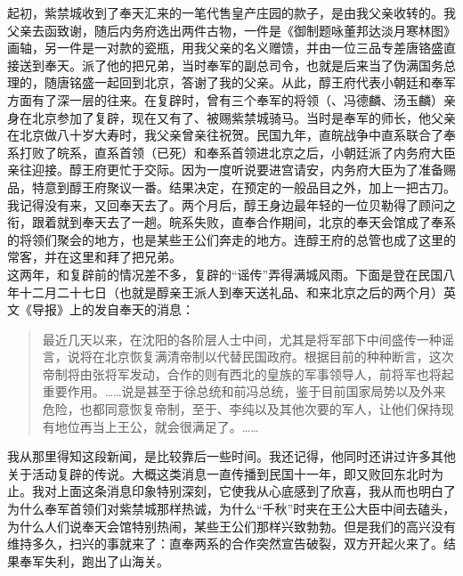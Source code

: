 起初，紫禁城收到了奉天汇来的一笔代售皇产庄园的款子，是由我父亲收转的。我父亲去函致谢，随后内务府选出两件古物，一件是《御制题咏董邦达淡月寒林图》画轴，另一件是一对款的瓷瓶，用我父亲的名义赠馈，并由一位三品专差唐铬盛直接送到奉天。派了他的把兄弟，当时奉军的副总司令，也就是后来当了伪满国务总理的，随唐铭盛一起回到北京，答谢了我的父亲。从此，醇王府代表小朝廷和奉军方面有了深一层的往来。在复辟时，曾有三个奉军的将领（、冯德麟、汤玉麟）亲身在北京参加了复辟，现在又有了、被赐紫禁城骑马。当时是奉军的师长，他父亲在北京做八十岁大寿时，我父亲曾亲往祝贺。民国九年，直皖战争中直系联合了奉系打败了皖系，直系首领（已死）和奉系首领进北京之后，小朝廷派了内务府大臣亲往迎接。醇王府更忙于交际。因为一度听说要进宫请安，内务府大臣为了准备赐品，特意到醇王府聚议一番。结果决定，在预定的一般品目之外，加上一把古刀。我记得没有来，又回奉天去了。两个月后，醇王身边最年轻的一位贝勒得了顾问之衔，跟着就到奉天去了一趟。皖系失败，直奉合作期间，北京的奉天会馆成了奉系的将领们聚会的地方，也是某些王公们奔走的地方。连醇王府的总管也成了这里的常客，并在这里和拜了把兄弟。\\

这两年，和复辟前的情况差不多，复辟的“谣传”弄得满城风雨。下面是登在民国八年十二月二十七日（也就是醇亲王派人到奉天送礼品、和来北京之后的两个月）英文《导报》上的发自奉天的消息：\\

\begin{quote}
	最近几天以来，在沈阳的各阶层人士中间，尤其是将军部下中间盛传一种谣言，说将在北京恢复满清帝制以代替民国政府。根据目前的种种断言，这次帝制将由张将军发动，合作的则有西北的皇族的军事领导人，前将军也将起重要作用。……说是甚至于徐总统和前冯总统，鉴于目前国家局势以及外来危险，也都同意恢复帝制，至于、李纯以及其他次要的军人，让他们保持现有地位再当上王公，就会很满足了。……\\
\end{quote}

我从那里得知这段新闻，是比较靠后一些时间。我还记得，他同时还讲过许多其他关于活动复辟的传说。大概这类消息一直传播到民国十一年，即又败回东北时为止。我对上面这条消息印象特别深刻，它使我从心底感到了欣喜，我从而也明白了为什么奉军首领们对紫禁城那样热诚，为什么“千秋”时夹在王公大臣中间去磕头，为什么人们说奉天会馆特别热闹，某些王公们那样兴致勃勃。但是我们的高兴没有维持多久，扫兴的事就来了：直奉两系的合作突然宣告破裂，双方开起火来了。结果奉军失利，跑出了山海关。\\

